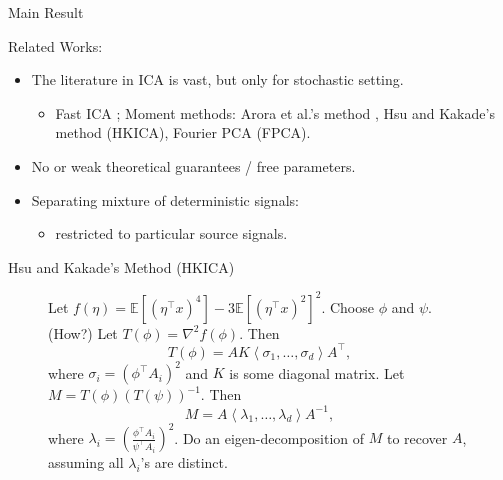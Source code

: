 \documentclass[final]{beamer} %
\newcommand{\EEp}[1]{\mathbb{E}\left[#1\right]}
\begin{document}
\begin{frame}[c]
\begin{columns}[t,totalwidth=\textwidth]
\begin{column}{.32\textwidth}
\begin{block}{Main Result}
\begin{center}
\begin{tcolorbox}[title = \vspace{0.4cm}\textbf{\large Main Result} \vspace{0.4cm}, title filled, width = 0.95\textwidth, colback = uofagreen!10, colframe = red]
				\end{tcolorbox}
			\end{center}
				{\large Related Works:}
			\begin{itemize}
						\item The literature in ICA is vast, but only for stochastic setting.
						\begin{itemize}
							\item Fast ICA \citep{hyvarinen1999fast}; Moment methods:
							Arora et al.'s method \citep{arora2012provable},
							Hsu and Kakade's method \citep{hsu2013learning} (HKICA), 
							Fourier PCA \citep{goyal2014fourier} (FPCA).	
						\end{itemize}
						\item No or weak theoretical guarantees / free parameters.
						\item Separating mixture of deterministic signals: \citet{kirimoto2011separation,forootan2013separation}
						\begin{itemize}
						\item restricted to particular source signals.
						\end{itemize}
					\end{itemize}
		\end{block}
		\vspace{0.5ex}
			\begin{block}{Hsu and Kakade's Method (HKICA)}
				\begin{figure}
				\begin{algorithmic}[1]
					\STATE Let $f(\eta) = \EEp{(\eta^{\top}x)^4} - 3 \EEp{(\eta^{\top}x)^2}^2$.
					\STATE  Choose $\phi$ and $\psi$. (How?)
					\STATE Let $T(\phi) = \nabla^2 f(\phi)$. Then 
						\[T(\phi) = AK \left\langle \sigma_1,\ldots,  \sigma_d\right\rangle A^{\top},
						\]
						where $\sigma_i = \left(\phi^{\top}A_i\right)^2$ and $K$ is some diagonal matrix.
					\STATE Let $M = T(\phi)(T(\psi))^{-1}$. Then 
						\[M = A \left\langle \lambda_1, \ldots, \lambda_d \right\rangle A^{-1},
						\]
						where $\lambda_i = \left(\frac{\phi^{\top}A_i}{\psi^{\top}A_i}\right)^2$.
						\vspace{0.5cm}
					\STATE Do an eigen-decomposition of $M$ to recover $A$, assuming all $\lambda_i$'s are distinct.
				\end{algorithmic}
				\end{figure}

			\end{block}
	\end{column}


\end{columns}
\end{frame}
\end{document}
